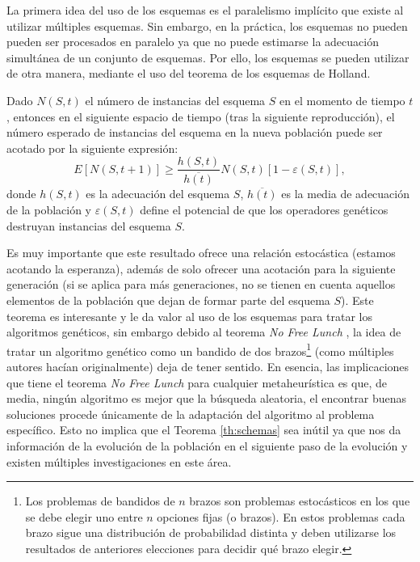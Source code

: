 La primera idea del uso de los esquemas es el paralelismo implícito que existe al utilizar múltiples esquemas. Sin embargo, en la práctica, los esquemas no pueden pueden ser procesados en paralelo ya que no puede estimarse la adecuación simultánea de un conjunto de esquemas. Por ello, los esquemas se pueden utilizar de otra manera, mediante el uso del teorema de los esquemas de Holland. 

\begin{theorem}\label{th:schemas}
    Dado $N(S,t)$ el número de instancias del esquema $S$ en el momento de tiempo $t$, entonces en el siguiente espacio de tiempo (tras la siguiente reproducción), el número esperado de instancias del esquema en la nueva población puede ser acotado por la siguiente expresión:
    \begin{equation*}
        E[N(S,t+1)]\geq\frac{h(S,t)}{\overline{h(t)}}N(S,t)[1- \varepsilon(S,t)],
    \end{equation*}
    donde $h(S,t)$ es la adecuación del esquema $S$, $\overline{h(t)}$ es la media de adecuación de la población y $\varepsilon(S,t)$ define el potencial de que los operadores genéticos destruyan instancias del esquema $S$.
\end{theorem}

Es muy importante que este resultado ofrece una relación estocástica (estamos acotando la esperanza), además de solo ofrecer una acotación para la siguiente generación (si se aplica para más generaciones, no se tienen en cuenta aquellos elementos de la población que dejan de formar parte del esquema $S$). Este teorema es interesante y le da valor al uso de los esquemas para tratar los algoritmos genéticos, sin embargo debido al teorema \textit{No Free Lunch} \cite{nflt}, la idea de tratar un algoritmo genético como un bandido de dos brazos\footnote{Los problemas de bandidos de $n$ brazos son problemas estocásticos en los que se debe elegir uno entre $n$ opciones fijas (o brazos). En estos problemas cada brazo sigue una distribución de probabilidad distinta y deben utilizarse los resultados de anteriores elecciones para decidir qué brazo elegir.} (como múltiples autores hacían originalmente) deja de tener sentido. En esencia, las implicaciones que tiene el teorema \textit{No Free Lunch} para cualquier metaheurística es que, de media, ningún algoritmo es mejor que la búsqueda aleatoria, el encontrar buenas soluciones procede únicamente de la adaptación del algoritmo al problema específico. Esto no implica que el Teorema \ref{th:schemas} sea inútil ya que nos da información de la evolución de la población en el siguiente paso de la evolución y existen múltiples investigaciones en este área.\\

